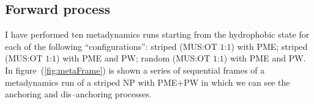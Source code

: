 \subsection{Forward process}
I have performed ten metadynamics runs starting from the hydrophobic state for each of the following ``configurations'': striped (\ac{MUS}:\ac{OT} $1$:$1$) with \ac{PME}; striped (\ac{MUS}:\ac{OT} $1$:$1$) with \ac{PME} and \ac{PW}; random (\ac{MUS}:\ac{OT} $1$:$1$) with \ac{PME} and \ac{PW}. In figure~(\ref{fig:metaFrame}) is shown a series of sequential frames of a metadynamics run of a striped \ac{NP} with \ac{PME}$+$\ac{PW} in which we can see the anchoring and dis--anchoring processes.
\begin{figure}[t!]
	\centering
		\ %
		\\\medskip%
		\ %
\end{figure}

